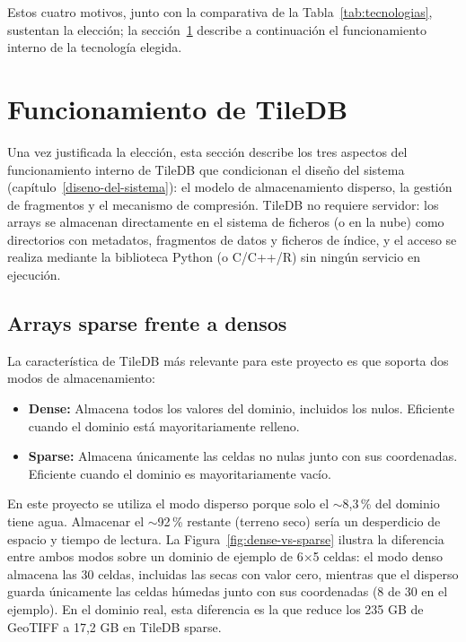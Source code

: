 Estos cuatro motivos, junto con la comparativa de la Tabla~\ref{tab:tecnologias}, sustentan la elección; la sección~\ref{tecnologia-tiledb} describe a continuación el funcionamiento interno de la tecnología elegida.

\section{Funcionamiento de TileDB}\label{tecnologia-tiledb}

Una vez justificada la elección, esta sección describe los tres aspectos del funcionamiento interno de TileDB que condicionan el diseño del sistema (capítulo~\ref{diseno-del-sistema}): el modelo de almacenamiento disperso, la gestión de fragmentos y el mecanismo de compresión. TileDB no requiere servidor: los arrays se almacenan directamente en el sistema de ficheros (o en la nube) como directorios con metadatos, fragmentos de datos y ficheros de índice, y el acceso se realiza mediante la biblioteca Python (o C/C++/R) sin ningún servicio en ejecución.

\subsection{Arrays sparse frente a densos}\label{arrays-sparse-vs.-densos}

La característica de TileDB más relevante para este proyecto es que soporta dos modos de almacenamiento:

\begin{itemize}
\item \textbf{Dense:} Almacena todos los valores del dominio, incluidos los nulos. Eficiente cuando el dominio está mayoritariamente relleno.
\item \textbf{Sparse:} Almacena únicamente las celdas no nulas junto con sus coordenadas. Eficiente cuando el dominio es mayoritariamente vacío.
\end{itemize}

En este proyecto se utiliza el modo disperso porque solo el $\sim$8,3\,\% del dominio tiene agua. Almacenar el $\sim$92\,\% restante (terreno seco) sería un desperdicio de espacio y tiempo de lectura. La Figura~\ref{fig:dense-vs-sparse} ilustra la diferencia entre ambos modos sobre un dominio de ejemplo de 6$\times$5 celdas: el modo denso almacena las 30 celdas, incluidas las secas con valor cero, mientras que el disperso guarda únicamente las celdas húmedas junto con sus coordenadas (8 de 30 en el ejemplo). En el dominio real, esta diferencia es la que reduce los 235 GB de GeoTIFF a 17,2 GB en TileDB sparse.

